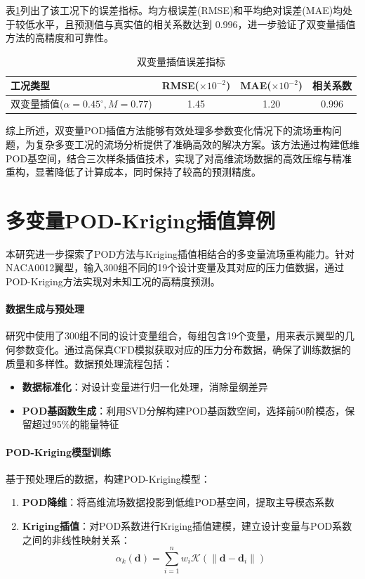 表\ref{tab:double_error}列出了该工况下的误差指标。均方根误差(RMSE)和平均绝对误差(MAE)均处于较低水平，且预测值与真实值的相关系数达到 0.996，进一步验证了双变量插值方法的高精度和可靠性。

\begin{table}[H]
\centering
\caption{双变量插值误差指标}
\label{tab:double_error}
\begin{tabular}{lccc}
\toprule
工况类型 & RMSE($\times10^{-2}$) & MAE($\times10^{-2}$) & 相关系数 \\
\midrule
双变量插值($\alpha=0.45^\circ, M=0.77$) & 1.45 & 1.20 & 0.996 \\
\bottomrule
\end{tabular}
\end{table}

综上所述，双变量POD插值方法能够有效处理多参数变化情况下的流场重构问题，为复杂多变工况的流场分析提供了准确高效的解决方案。该方法通过构建低维POD基空间，结合三次样条插值技术，实现了对高维流场数据的高效压缩与精准重构，显著降低了计算成本，同时保持了较高的预测精度。
\section{多变量POD-Kriging插值算例}
\label{sec:multi_variable_pod_kriging}

本研究进一步探索了POD方法与Kriging插值相结合的多变量流场重构能力。针对NACA0012翼型，输入300组不同的19个设计变量及其对应的压力值数据，通过POD-Kriging方法实现对未知工况的高精度预测。

\paragraph{数据生成与预处理}
研究中使用了300组不同的设计变量组合，每组包含19个变量，用来表示翼型的几何参数变化。通过高保真CFD模拟获取对应的压力分布数据，确保了训练数据的质量和多样性。数据预处理流程包括：
\begin{itemize}
    \item \textbf{数据标准化}：对设计变量进行归一化处理，消除量纲差异
    \item \textbf{POD基函数生成}：利用SVD分解构建POD基函数空间，选择前50阶模态，保留超过95\%的能量特征
\end{itemize}

\paragraph{POD-Kriging模型训练}
基于预处理后的数据，构建POD-Kriging模型：
\begin{enumerate}
    \item \textbf{POD降维}：将高维流场数据投影到低维POD基空间，提取主导模态系数
    \item \textbf{Kriging插值}：对POD系数进行Kriging插值建模，建立设计变量与POD系数之间的非线性映射关系：
    \begin{equation}
        \alpha_k(\boldsymbol{d}) = \sum_{i=1}^n w_i \mathcal{K}(\|\boldsymbol{d} - \boldsymbol{d}_i\|)
        \label{eq:kriging_model}
    \end{equation}
\end{enumerate}

